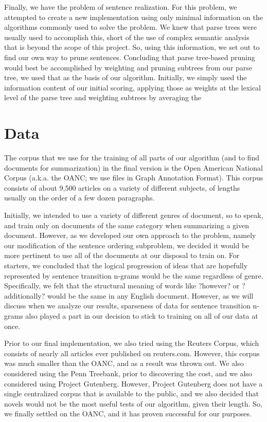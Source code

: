 \documentclass[12pt]{article}
\theoremstyle{plain}
\theoremstyle{definition}
\theoremstyle{remark}
\theoremstyle{plain}
\begin{document}
Finally, we have the problem of sentence realization. For this problem, we attempted to create a new implementation using only minimal information on the algorithms commonly used to solve the problem. We knew that parse trees were usually used to accomplish this, short of the use of complex semantic analysis that is beyond the scope of this project. So, using this information, we set out to find our own way to prune sentences. 
Concluding that parse tree-based pruning would best be accomplished by weighting and pruning subtrees from our parse tree, we used that as the basis of our algorithm. Initially, we simply used the information content of our initial scoring, applying those as weights at the lexical level of the parse tree and weighting subtrees by averaging the 
\section{Data}
	The corpus that we use for the training of all parts of our algorithm (and to find documents for summarization) in the final version is the Open American National Corpus (a.k.a. the OANC; we use files in Graph Annotation Format). This corpus consists of about 9,500 articles on a variety of different subjects, of lengths usually on the order of a few dozen paragraphs. 
	
Initially, we intended to use a variety of different genres of document, so to speak, and train only on documents of the same category when summarizing a given document. However, as we developed our own approach to the problem, namely our modification of the sentence ordering subproblem, we decided it would be more pertinent to use all of the documents at our disposal to train on. For starters, we concluded that the logical progression of ideas that are hopefully represented by sentence transition n-grams would be the same regardless of genre. Specifically, we felt that the structural meaning of words like ?however? or ?additionally? would be the same in any English document. However, as we will discuss when we analyze our results, sparseness of data for sentence transition n-grams also played a part in our decision to stick to training on all of our data at once. 

	Prior to our final implementation, we also tried using the Reuters Corpus, which consists of nearly all articles ever published on reuters.com. However, this corpus was much smaller than the OANC, and as a result was thrown out. We also considered using the Penn Treebank, prior to discovering the cost, and we also considered using Project Gutenberg. However, Project Gutenberg does not have a single centralized corpus that is available to the public, and we also decided that novels would not be the most useful tests of our algorithm, given their length. So, we finally settled on the OANC, and it has proven successful for our purposes.
\end{document}
